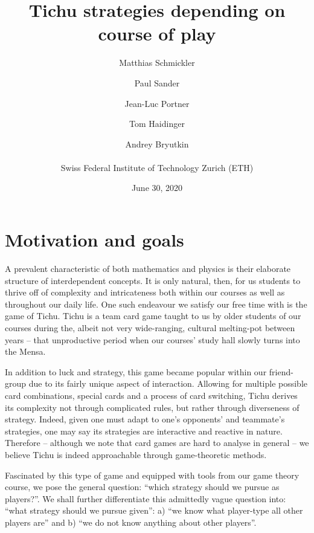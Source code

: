 


\usepackage{multirow}
\usepackage{listings}
\usepackage{commath}
\usepackage{subcaption}
\usepackage{stfloats}



\title{Tichu strategies depending on course of play}
\date{June 30, 2020}
\author{Matthias Schmickler \and Paul Sander \and Jean-Luc Portner \and Tom Haidinger \and Andrey Bryutkin \\ \\ Swiss Federal Institute of Technology Zurich (ETH)}
\maketitle

\section*{Motivation and goals}

A prevalent characteristic of both mathematics and physics is their elaborate structure of interdependent concepts. It is only natural, then, for us students to thrive off of complexity and intricateness both within our courses as well as throughout our daily life. One such endeavour we satisfy our free time with is the game of Tichu. Tichu is a team card game taught to us by older students of our courses during the, albeit not very wide-ranging, cultural melting-pot between years – that unproductive period when our courses’ study hall slowly turns into the Mensa. 

    In addition to luck and strategy, this game became popular within our friend-group due to its fairly unique aspect of interaction. Allowing for multiple possible card combinations, special cards and a process of card switching, Tichu derives its complexity not through complicated rules, but rather through diverseness of strategy. Indeed, given one must adapt to one’s opponents’ and teammate’s strategies, one may say its strategies are interactive and reactive in nature. Therefore – although we note that card games are hard to analyse in general – we believe Tichu is indeed approachable through game-theoretic methods. 

    Fascinated by this type of game and equipped with tools from our game theory course, we pose the general question: “which strategy should we pursue as players?”. We shall further differentiate this admittedly vague question into: “what strategy should we pursue given”: a) “we know what player-type all other players are” and b) “we do not know anything about other players”. 
    
